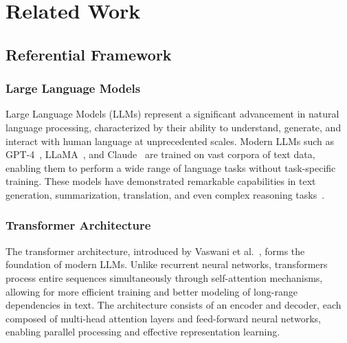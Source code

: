 \chapter{Related Work}
\label{cha:sota}



\section{Referential Framework}
\subsection{Large Language Models}
Large Language Models (LLMs) represent a significant advancement 
in natural language processing, characterized by their ability to 
understand, generate, and interact with human language at unprecedented 
scales. Modern LLMs such as GPT-4~\cite{openai2023}, LLaMA~\cite{grattafiori2024llama3herdmodels}, 
and Claude~\cite{anthropic2023} are trained on vast corpora of text data, 
enabling them to perform a wide range of language tasks without task-specific training. 
These models have demonstrated remarkable capabilities in text generation, summarization, translation, 
and even complex reasoning tasks~\cite{brown2020}.
\subsection{Transformer Architecture}
The transformer architecture, introduced by Vaswani et 
al.~\cite{vaswani2023attentionneed}, forms the foundation of modern 
LLMs. Unlike recurrent neural networks, transformers process entire 
sequences simultaneously through self-attention mechanisms, allowing for 
more efficient training and better modeling of long-range dependencies in 
text. The architecture consists of an encoder and decoder, each composed 
of multi-head attention layers and feed-forward neural networks, enabling 
parallel processing and effective representation learning.
